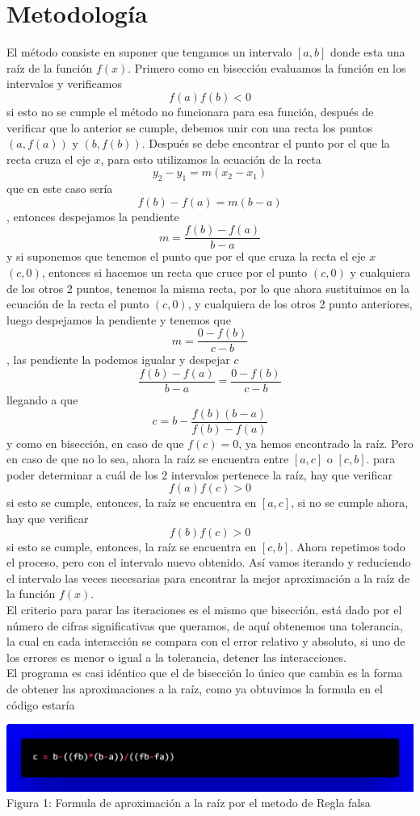 \documentclass[12pt]{article}
\begin{document}
		\section*{\centering Metodología}\label{sec:Metodologia}
			El método consiste en suponer que tengamos un intervalo $ [a,b] $ donde esta una raíz de la función $ f(x) $. 
			Primero como en bisección evaluamos la función en los intervalos y verificamos $$ f(a)f(b) < 0 $$ 
			si esto no se cumple el método no funcionara para esa función, después de verificar que lo 
			anterior se cumple, debemos unir con una recta los puntos $ (a,f(a)) $ y $ (b,f(b)) $. Después se debe 
			encontrar el punto por el que la recta cruza el eje $ x $, para esto utilizamos la ecuación de la recta 
			$$ y_2-y_1 = m(x_2-x_1) $$ que en este caso sería $$ f(b)-f(a) = m (b-a) $$, entonces despejamos la 
			pendiente $$ m = \frac{f(b)-f(a)}{b-a} $$ y si suponemos que tenemos el punto que por el que cruza la recta 
			el eje $ x $ $ (c,0) $, entonces si hacemos un recta que cruce por el punto $ (c,0) $ y cualquiera 
			de los otros 2 puntos, tenemos la misma recta, por lo que ahora sustituimos en la ecuación de la 
			recta el punto $ (c,0) $, y cualquiera de los otros 2 punto anteriores, luego despejamos la pendiente y tenemos 
			que $$ m = \frac{0-f(b)}{c-b} $$, las pendiente la podemos igualar y despejar $ c $ $$ \frac{f(b)-f(a)}{b-a} = \frac{0-f(b)}{c-b} $$ 
			llegando a que $$ c = b-\frac{f(b)(b-a)}{f(b)-f(a)} $$ y como en bisección, en caso de que $ f(c) = 0 $, ya hemos 
			encontrado la raíz. Pero en caso de que no lo sea, ahora la raíz se encuentra entre $ [a,c] $ o $ [c,b] $. 
			para poder determinar a cuál de los 2 intervalos pertenece la raíz, hay que verificar $$ f(a)f(c) > 0 $$ 
			si esto se cumple, entonces, la raíz se encuentra en $ [a,c] $, si no se cumple ahora, hay que verificar 
			$$ f(b)f(c) > 0 $$ si esto se cumple, entonces, la raíz se encuentra en $ [c,b] $. Ahora repetimos todo el 
			proceso, pero con el intervalo nuevo obtenido. Así vamos iterando y reduciendo el intervalo las veces necesarias 
			para encontrar la mejor aproximación a la raíz de la función $ f(x) $.\\ 
			El criterio para parar las iteraciones es el mismo que bisección, está dado por el número de cifras 
			significativas que queramos, de aquí obtenemos una tolerancia, la cual en cada interacción se 
			compara con el error relativo y absoluto, si uno de los errores es menor o igual a la tolerancia, 
			detener las interacciones.\\
			El programa es casi idéntico que el de bisección lo único que cambia es la forma de obtener las 
			aproximaciones a la raíz, como ya obtuvimos la formula en el código estaría
			\begin{center}
				\includegraphics[width=\linewidth]{Figura 1.png} 
				Figura 1: Formula de aproximación a la raíz por el metodo de Regla falsa				
			\end{center}
	
\end{document}
